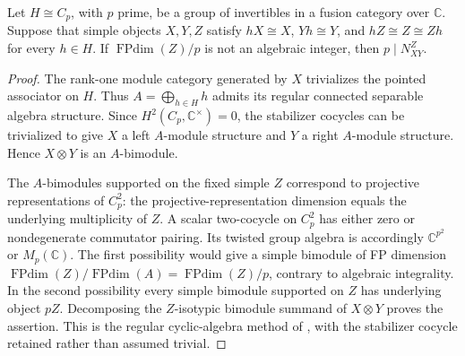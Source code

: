 \begin{lemma}\label{lem:cyclic-module-divisibility}
Let $H\cong C_p$, with $p$ prime, be a group of invertibles in a
fusion category over $\mathbb C$. Suppose that simple objects $X,Y,Z$
satisfy $hX\cong X$, $Yh\cong Y$, and $hZ\cong Z\cong Zh$ for every
$h\in H$. If $\operatorname{FPdim}(Z)/p$ is not an algebraic integer,
then $p\mid N_{XY}^{Z}$.
\end{lemma}
\begin{proof}
The rank-one module category generated by $X$ trivializes the pointed
associator on $H$. Thus $A=\bigoplus_{h\in H}h$ admits its regular
connected separable algebra structure. Since
$H^2(C_p,\mathbb C^\times)=0$, the stabilizer cocycles can be
trivialized to give $X$ a left $A$-module structure and $Y$ a right
$A$-module structure. Hence $X\otimes Y$ is an $A$-bimodule.

The $A$-bimodules supported on the fixed simple $Z$ correspond to
projective representations of $C_p^2$: the projective-representation
dimension equals the underlying multiplicity of $Z$. A scalar
two-cocycle on $C_p^2$ has either zero or nondegenerate commutator
pairing. Its twisted group algebra is accordingly
$\mathbb C^{p^2}$ or $M_p(\mathbb C)$. The first possibility would
give a simple bimodule of FP dimension
$\operatorname{FPdim}(Z)/\operatorname{FPdim}(A)
=\operatorname{FPdim}(Z)/p$, contrary to algebraic integrality.
In the second possibility every simple bimodule supported on $Z$
has underlying object $pZ$. Decomposing the $Z$-isotypic bimodule
summand of $X\otimes Y$ proves the assertion. This is the regular
cyclic-algebra method of \cite[Lemmas~6.1--6.2]{EGODimPQ}, with
the stabilizer cocycle retained rather than assumed trivial.
\end{proof}
